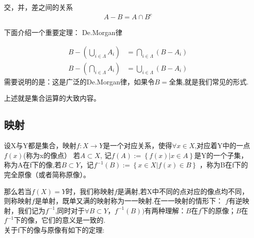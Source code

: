 \begin{theorem}
    交，并，差之间的关系
    \begin{align}
        A-B= A\cap B^c
    \end{align}
\end{theorem}
下面介绍一个重要定理： De.Morgan律
\begin{theorem}
    \begin{align}
        B - (\bigcup_{i \in \Lambda} A_i)&=\bigcap_{i \in \Lambda}(B - A_i) \\
        B-(\bigcap_{i \in \Lambda} A_i)&=\bigcup_{i \in \Lambda}(B-A_i)
    \end{align}
    需要说明的是：这是广泛的De.Morgan律，如果令\(B= \textbf{全集}\),就是我们常见的形式.
\end{theorem}
上述就是集合运算的大致内容。
\subsection*{映射}
\begin{definition}
    设X与Y都是集合，映射\(f: X \rightarrow Y \)是一个对应关系，使得\(\forall x \in X\),对应着Y中的一点\(f(x)\)(称为x的像点）
    若\(A \subset X \), 记\(f(A) := \left\{f(x) | x \in A \right\}\)是Y的一个子集，称为A在f下的像,若\(B \subset Y \)，记\(f^{-1}(B) := \left\{x \in X|f(x) \in B \right\} \) ，称为B在f下的完全原像（或者简称原像）。
\end{definition}
那么若当\(f(X)=Y\)时，我们称映射\(f\)是满射,若X中不同的点对应的像点均不同，则称映射\(f\)是单射，既单又满的映射称为一一映射.在一一映射的情形下： \(f\)有逆映射，我们记为\(f^{-1}\),同时对于\(\forall B \subset Y，f^{-1}(B))\)有两种理解：\(B\)在\(f\)下的原像；\(B\)在\(f^{-1}\)下的像，它们的意义是一致的.
\\
关于f下的像与原像有如下的定理: 
